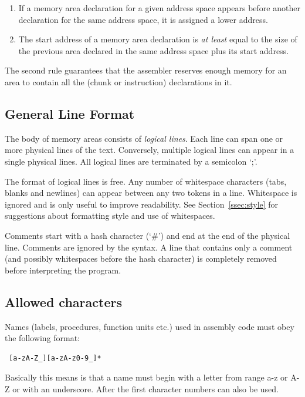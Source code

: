 \documentclass[a4paper,twoside]{tceusermanual}
\begin{document}
\begin{enumerate}
\item %
  If a memory area declaration for a given address space appears before
  another declaration for the same address space, it is assigned a lower
  address.
\item %
  The start address of a memory area declaration is \emph{at least} equal to
  the size of the previous area declared in the same address space plus its
  start address.
\end{enumerate}

The second rule guarantees that the assembler reserves enough memory for an
area to contain all the (chunk or instruction) declarations in it.

\subsection{General Line Format}
\label{ssec:lines}

The body of memory areas consists of \emph{logical lines}.  Each line can
span one or more physical lines of the text. Conversely, multiple logical
lines can appear in a single physical lines.  All logical lines are
terminated by a semicolon `;'.

The format of logical lines is free. Any number of whitespace characters
(tabs, blanks and newlines) can appear between any two tokens in a line.
Whitespace is ignored and is only useful to improve readability. See
Section~\ref{ssec:style} for suggestions about formatting style and use of
whitespaces.

Comments start with a hash character (`\#') and end at the end of the
physical line.  Comments are ignored by the syntax.  A line that contains
only a comment (and possibly whitespaces before the hash character) is
completely removed before interpreting the program.

\subsection{Allowed characters}
\label{sec:names}

Names (labels, procedures, function units etc.) used in assembly code must
obey the following format:

\begin{verbatim}
 [a-zA-Z_][a-zA-z0-9_]*
\end{verbatim}

Basically this means is that a name must begin with a letter from range
a-z or A-Z or with an underscore. After the first character numbers can also
be used.
\end{document}
